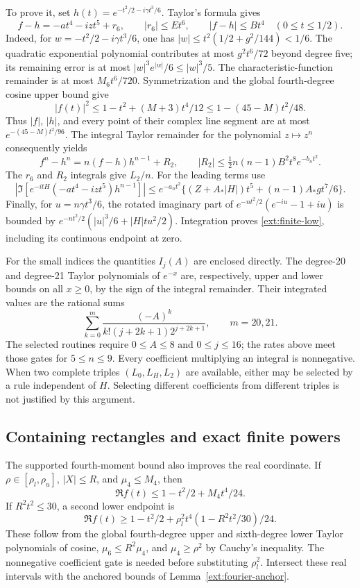 To prove it, set $h(t)=e^{-t^2/2-i\gamma t^3/6}$. Taylor's formula gives
\[
 f-h=-at^4-izt^5+r_6,\qquad |r_6|\le Et^6,
 \qquad |f-h|\le Bt^4 \quad(0\le t\le1/2).
\]
Indeed, for $w=-t^2/2-i\gamma t^3/6$, one has
$|w|\le t^2(1/2+g^2/144)<1/6$. The quadratic exponential
polynomial contributes at most $g^2t^6/72$ beyond degree five; its
remaining error is at most $|w|^3e^{|w|}/6\le |w|^3/5$.
The characteristic-function remainder is at most $M_6t^6/720$.
Symmetrization and the global fourth-degree cosine upper bound give
\[
 |f(t)|^2\le1-t^2+(M+3)t^4/12
           \le1-(45-M)t^2/48.
\]
Thus $|f|$, $|h|$, and every point of their complex line segment are
at most $e^{-(45-M)t^2/96}$. The integral Taylor remainder for the
polynomial $z\mapsto z^n$ consequently yields
\[
 f^n-h^n=n(f-h)h^{n-1}+R_2,\qquad
 |R_2|\le\tfrac12 n(n-1)B^2t^8e^{-b_nt^2}.
\]
The $r_6$ and $R_2$ integrals give $L_2/n$. For the leading terms use
\[
 |\Im[e^{-itH}(-at^4-izt^5)h^{n-1}]|
 \le e^{-a_nt^2}\{(Z+A_*|H|)t^5+(n-1)A_*gt^7/6\}.
\]
Finally, for $u=n\gamma t^3/6$, the rotated imaginary part of
$e^{-nt^2/2}(e^{-iu}-1+iu)$ is bounded by
$e^{-nt^2/2}(|u|^3/6+|H|tu^2/2)$. Integration proves
\eqref{ext:finite-low}, including its continuous endpoint at zero.

For the small indices the quantities $I_j(A)$ are enclosed directly.
The degree-20 and degree-21 Taylor polynomials of $e^{-x}$ are,
respectively, upper and lower bounds on all $x\ge0$, by the sign of
the integral remainder. Their integrated values are the rational sums
\[
 \sum_{k=0}^{m}\frac{(-A)^k}{k!(j+2k+1)2^{j+2k+1}},
 \qquad m=20,21.
\]
The selected routines require $0\le A\le8$ and $0\le j\le16$;
the rates above meet those gates for $5\le n\le9$.
Every coefficient multiplying an integral is nonnegative. When two
complete triples $(L_0,L_H,L_2)$ are available, either may be selected
by a rule independent of $H$. Selecting different coefficients from
different triples is not justified by this argument.

\subsection{Containing rectangles and exact finite powers}
The supported fourth-moment bound also improves the real coordinate.
If $\rho\in[\rho_l,\rho_u]$, $|X|\le R$, and $\mu_4\le M_4$, then
\[
 \Re f(t)\le1-t^2/2+M_4t^4/24.
\]
If $R^2t^2\le30$, a second lower endpoint is
\[
 \Re f(t)\ge1-t^2/2
              +\rho_l^2t^4(1-R^2t^2/30)/24.
\]
These follow from the global fourth-degree upper and sixth-degree
lower Taylor polynomials of cosine, $\mu_6\le R^2\mu_4$, and
$\mu_4\ge\rho^2$ by Cauchy's inequality. The nonnegative coefficient
gate is needed before substituting $\rho_l^2$. Intersect these real
intervals with the anchored bounds of Lemma~\ref{ext:fourier-anchor}.

